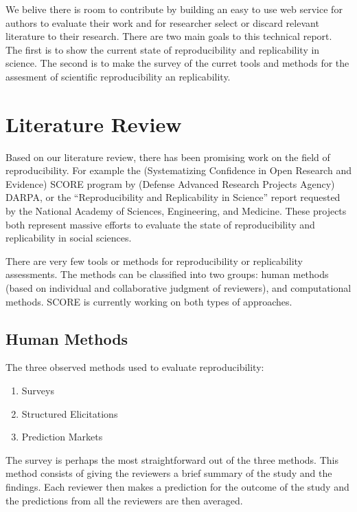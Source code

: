 \documentclass[
10pt, %
a4paper, %
oneside, %
headinclude,footinclude, %
BCOR5mm, %
]{scrartcl}
\begin{document}
We belive there is room to contribute by building an easy to use web service for authors to evaluate their work and for researcher select or discard relevant literature to their research. 
There are two main goals to this technical report. The first is to show the current state of reproducibility and replicability in science. The second is to make the survey of the curret tools and methods for the assesment of scientific reproducibility an replicability. 


 

\section{Literature Review}
Based on our literature review, there has been promising work on the field of reproducibility. For example the (Systematizing Confidence in Open Research and Evidence) SCORE program by (Defense Advanced Research Projects Agency) DARPA, or the “Reproducibility and Replicability in Science” report requested by the National Academy of Sciences, Engineering, and Medicine. These projects both represent massive efforts to evaluate the state of reproducibility and replicability in social sciences. 

There are very few tools or methods for reproducibility or replicability assessments.
The methods can be classified into two groups: human methods (based on individual and collaborative judgment of reviewers), and computational methods. SCORE is currently working on both types of approaches. 

\subsection{Human Methods}
The three observed methods used to evaluate reproducibility:
\begin{enumerate}[noitemsep] %
\item Surveys
\item Structured Elicitations
\item Prediction Markets
\end{enumerate}

The survey is perhaps the most straightforward out of the three methods. This method consists of giving the reviewers a brief summary of the study and the findings. Each reviewer then makes a prediction for the outcome of the study and the predictions from all the reviewers are then averaged. 
\end{document}
